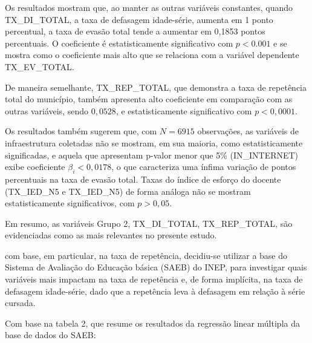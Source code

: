 \documentclass[english, spanish, brazilian]{RBIEarticle} %
\begin{document}
Os resultados mostram que, ao manter as outras variáveis constantes, quando TX\_DI\_TOTAL, a taxa de defasagem idade-série, aumenta em 1 ponto percentual, a taxa de evasão total tende a aumentar em 0,1853 pontos percentuais. O coeficiente é estatisticamente significativo com $p<0.001$ e se mostra como o coeficiente mais alto que se relaciona com a variável dependente TX\_EV\_TOTAL.

De maneira semelhante, TX\_REP\_TOTAL, que demonstra a taxa de repetência total do município, também apresenta alto coeficiente em comparação com as outras variáveis, sendo $0,0528$, e estatisticamente significativo com $p<0,0001$.

Os resultados também sugerem que, com $N=6915$ observações, as variáveis de infraestrutura coletadas não se mostram, em sua maioria, como estatisticamente significadas, e aquela que apresentam p-valor menor que 5\% (IN\_INTERNET) exibe coeficiente $\beta_i<0,0178$, o que caracteriza uma ínfima variação de pontos percentuais na taxa de evasão total. Taxas do índice de esforço do docente (TX\_IED\_N5 e TX\_IED\_N5) de forma análoga não se mostram estatisticamente significativos, com $p>0,05$.

Em resumo, as variáveis Grupo 2, TX\_DI\_TOTAL, TX\_REP\_TOTAL, são evidenciadas como as mais relevantes no presente estudo. 

com base, em particular, na taxa de repetência, decidiu-se utilizar a base do Sistema de Avaliação do Educação básica (SAEB) do INEP, para investigar quais variáveis mais impactam na taxa de repetência e, de forma implícita, na taxa de defasagem idade-série, dado que a repetência leva à defasagem em relação à série cursada.

Com base na tabela 2, que resume os resultados da regressão linear múltipla da base de dados do SAEB:
\end{document}
